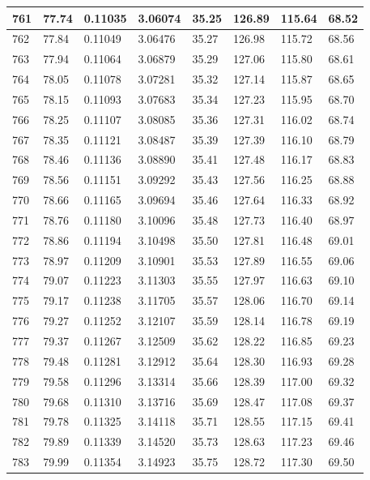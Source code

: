 \documentclass[12pt,a4paper,twoside]{article}
\begin{document}
\begin{center}
\begin{longtable}{l l l l | l l l l}
761 & 77.74 & 0.11035 & 3.06074 & 35.25 & 126.89 & 115.64 & 68.52 \\ \hline
762 & 77.84 & 0.11049 & 3.06476 & 35.27 & 126.98 & 115.72 & 68.56 \\ \hline
763 & 77.94 & 0.11064 & 3.06879 & 35.29 & 127.06 & 115.80 & 68.61 \\ \hline
764 & 78.05 & 0.11078 & 3.07281 & 35.32 & 127.14 & 115.87 & 68.65 \\ \hline
765 & 78.15 & 0.11093 & 3.07683 & 35.34 & 127.23 & 115.95 & 68.70 \\ \hline
766 & 78.25 & 0.11107 & 3.08085 & 35.36 & 127.31 & 116.02 & 68.74 \\ \hline
767 & 78.35 & 0.11121 & 3.08487 & 35.39 & 127.39 & 116.10 & 68.79 \\ \hline
768 & 78.46 & 0.11136 & 3.08890 & 35.41 & 127.48 & 116.17 & 68.83 \\ \hline
769 & 78.56 & 0.11151 & 3.09292 & 35.43 & 127.56 & 116.25 & 68.88 \\ \hline
770 & 78.66 & 0.11165 & 3.09694 & 35.46 & 127.64 & 116.33 & 68.92 \\ \hline
771 & 78.76 & 0.11180 & 3.10096 & 35.48 & 127.73 & 116.40 & 68.97 \\ \hline
772 & 78.86 & 0.11194 & 3.10498 & 35.50 & 127.81 & 116.48 & 69.01 \\ \hline
773 & 78.97 & 0.11209 & 3.10901 & 35.53 & 127.89 & 116.55 & 69.06 \\ \hline
774 & 79.07 & 0.11223 & 3.11303 & 35.55 & 127.97 & 116.63 & 69.10 \\ \hline
775 & 79.17 & 0.11238 & 3.11705 & 35.57 & 128.06 & 116.70 & 69.14 \\ \hline
776 & 79.27 & 0.11252 & 3.12107 & 35.59 & 128.14 & 116.78 & 69.19 \\ \hline
777 & 79.37 & 0.11267 & 3.12509 & 35.62 & 128.22 & 116.85 & 69.23 \\ \hline
778 & 79.48 & 0.11281 & 3.12912 & 35.64 & 128.30 & 116.93 & 69.28 \\ \hline
779 & 79.58 & 0.11296 & 3.13314 & 35.66 & 128.39 & 117.00 & 69.32 \\ \hline
780 & 79.68 & 0.11310 & 3.13716 & 35.69 & 128.47 & 117.08 & 69.37 \\ \hline
781 & 79.78 & 0.11325 & 3.14118 & 35.71 & 128.55 & 117.15 & 69.41 \\ \hline
782 & 79.89 & 0.11339 & 3.14520 & 35.73 & 128.63 & 117.23 & 69.46 \\ \hline
783 & 79.99 & 0.11354 & 3.14923 & 35.75 & 128.72 & 117.30 & 69.50 \\ \hline

\end{longtable}
\end{center}
\end{document}
